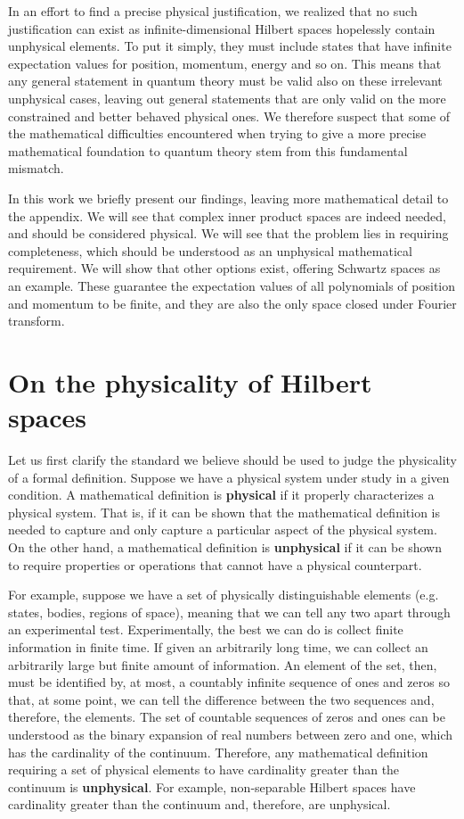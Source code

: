 \documentclass[10pt,twocolumn, nofootinbib]{revtex4-2}
\begin{document}
In an effort to find a precise physical justification, we realized that no such justification can exist as infinite-dimensional Hilbert spaces hopelessly contain unphysical elements. To put it simply, they must include states that have infinite expectation values for position, momentum, energy and so on. This means that any general statement in quantum theory must be valid also on these irrelevant unphysical cases, leaving out general statements that are only valid on the more constrained and better behaved physical ones. We therefore suspect that some of the mathematical difficulties encountered when trying to give a more precise mathematical foundation to quantum theory stem from this fundamental mismatch.

In this work we briefly present our findings, leaving more mathematical detail to the appendix. We will see that complex inner product spaces are indeed needed, and should be considered physical. We will see that the problem lies in requiring completeness, which should be understood as an unphysical mathematical requirement. We will show that other options exist, offering Schwartz spaces as an example. These guarantee the expectation values of all polynomials of position and momentum to be finite, and they are also the only space closed under Fourier transform.

\section{On the physicality of Hilbert spaces}

Let us first clarify the standard we believe should be used to judge the physicality of a formal definition.\cite{redei_tension_2020, north_physics_2021} Suppose we have a physical system under study in a given condition. A mathematical definition is \textbf{physical} if it properly characterizes a physical system. That is, if it can be shown that the mathematical definition is needed to capture and only capture a particular aspect of the physical system. On the other hand, a mathematical definition is \textbf{unphysical} if it can be shown to require properties or operations that cannot have a physical counterpart.

For example, suppose we have a set of physically distinguishable elements (e.g. states, bodies, regions of space), meaning that we can tell any two apart through an experimental test. Experimentally, the best we can do is collect finite information in finite time. If given an arbitrarily long time, we can collect an arbitrarily large but finite amount of information. An element of the set, then, must be identified by, at most, a countably infinite sequence of ones and zeros so that, at some point, we can tell the difference between the two sequences and, therefore, the elements. The set of countable sequences of zeros and ones can be understood as the binary expansion of real numbers between zero and one, which has the cardinality of the continuum. Therefore, any mathematical definition requiring a set of physical elements to have cardinality greater than the continuum is \textbf{unphysical}. For example, non-separable Hilbert spaces have cardinality greater than the continuum and, therefore, are unphysical.\cite{pittphilsci18363}
\end{document}

